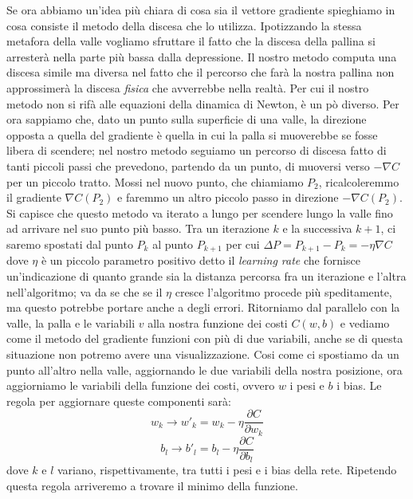 Se ora abbiamo un'idea più chiara di cosa sia il vettore gradiente spieghiamo in cosa consiste il metodo della discesa che lo utilizza. Ipotizzando la stessa metafora della valle vogliamo sfruttare il fatto che la discesa della pallina si arresterà nella parte più bassa dalla depressione. Il nostro metodo computa una discesa simile ma diversa nel fatto che il percorso che farà la nostra pallina non approssimerà la discesa \textit{fisica} che avverrebbe nella realtà. Per cui il nostro metodo non si rifà alle equazioni della dinamica di Newton, è un pò diverso. Per ora sappiamo che, dato un punto sulla superficie di una valle, la direzione opposta a quella del gradiente è quella in cui la palla si muoverebbe se fosse libera di scendere; nel nostro metodo seguiamo un percorso di discesa fatto di tanti piccoli passi che prevedono, partendo da un punto, di muoversi verso $-\nabla C$ per un piccolo tratto. Mossi nel nuovo punto, che chiamiamo $P_{2}$, ricalcoleremmo il gradiente $\nabla C(P_{2})$ e faremmo un altro piccolo passo in direzione $- \nabla C(P_{2})$. Si capisce che questo metodo va iterato a lungo per scendere lungo la valle fino ad arrivare nel suo punto più basso. Tra un iterazione $k$ e la successiva $k+1$, ci saremo spostati dal punto $P_{k}$ al punto $P_{k+1}$ per cui $ \Delta P= P_{k+1}-P_{k}=-\eta \nabla C$ dove $\eta$ è un piccolo parametro positivo detto il \textit{learning rate} che fornisce un'indicazione di quanto grande sia la distanza percorsa fra un iterazione e l'altra nell'algoritmo; va da se che se il $\eta$ cresce l'algoritmo procede più speditamente, ma questo potrebbe portare anche a degli errori. Ritorniamo dal parallelo con la valle, la palla e le variabili $v$ alla nostra funzione dei costi $C(w, b)$ e vediamo come il metodo del gradiente funzioni con più di due variabili, anche se di questa situazione non potremo avere una visualizzazione. Cosi come ci spostiamo da un punto all'altro nella valle, aggiornando le due variabili della nostra posizione, ora aggiorniamo le variabili della funzione dei costi, ovvero $w$ i pesi e $b$ i bias. Le regola per aggiornare queste componenti sarà:
\begin{equation}
w_{k}\rightarrow w'_{k}=w_{k}-\eta \dfrac{\partial C}{\partial w_{k}}
\end{equation}
\begin{equation}
b_{l}\rightarrow b'_{l}=b_{l}-\eta \dfrac{\partial C}{\partial b_{l}}
\end{equation}
dove $k$ e $l$ variano, rispettivamente, tra tutti i pesi e i bias della rete. Ripetendo questa regola arriveremo a trovare il minimo della funzione.
